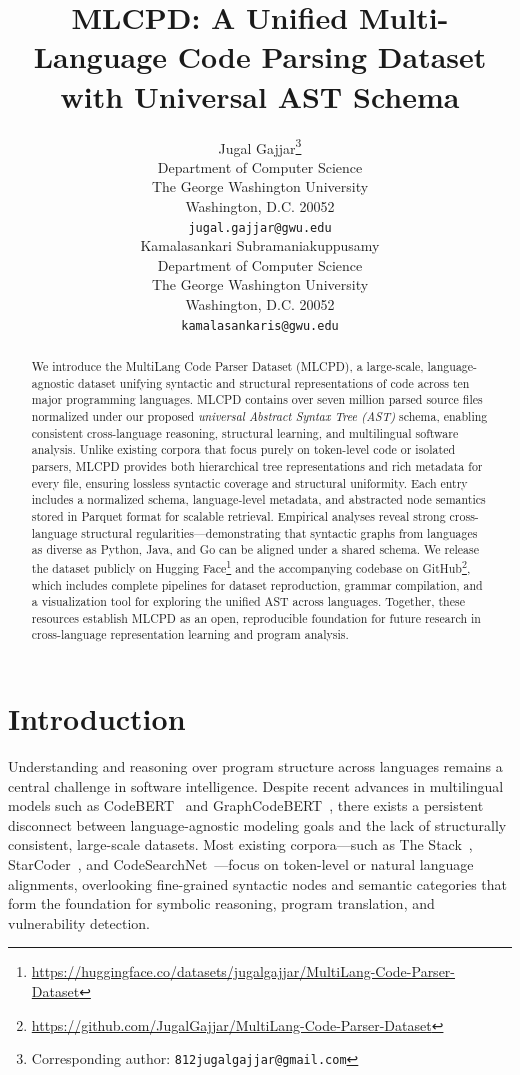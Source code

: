 \documentclass{article}
\title{MLCPD: A Unified Multi-Language Code Parsing Dataset with Universal AST Schema}
\author{
  Jugal Gajjar\thanks{Corresponding author: \texttt{812jugalgajjar@gmail.com}} \\
  Department of Computer Science\\
  The George Washington University\\
  Washington, D.C. 20052 \\
  \texttt{jugal.gajjar@gwu.edu} \\
  \And
  Kamalasankari Subramaniakuppusamy \\
  Department of Computer Science\\
  The George Washington University\\
  Washington, D.C. 20052 \\
  \texttt{kamalasankaris@gwu.edu} \\
}
\begin{document}
\maketitle

\begin{abstract}
We introduce the MultiLang Code Parser Dataset (MLCPD), a large-scale, language-agnostic dataset unifying syntactic and structural representations of code across ten major programming languages. MLCPD contains over seven million parsed source files normalized under our proposed \emph{universal Abstract Syntax Tree (AST)} schema, enabling consistent cross-language reasoning, structural learning, and multilingual software analysis. Unlike existing corpora that focus purely on token-level code or isolated parsers, MLCPD provides both hierarchical tree representations and rich metadata for every file, ensuring lossless syntactic coverage and structural uniformity. Each entry includes a normalized schema, language-level metadata, and abstracted node semantics stored in Parquet format for scalable retrieval. Empirical analyses reveal strong cross-language structural regularities—demonstrating that syntactic graphs from languages as diverse as Python, Java, and Go can be aligned under a shared schema. We release the dataset publicly on Hugging Face\footnote{\url{https://huggingface.co/datasets/jugalgajjar/MultiLang-Code-Parser-Dataset}} and the accompanying codebase on GitHub\footnote{\url{https://github.com/JugalGajjar/MultiLang-Code-Parser-Dataset}}, which includes complete pipelines for dataset reproduction, grammar compilation, and a visualization tool for exploring the unified AST across languages. Together, these resources establish MLCPD as an open, reproducible foundation for future research in cross-language representation learning and program analysis.
\end{abstract}

\section{Introduction}

Understanding and reasoning over program structure across languages remains a central challenge in software intelligence. Despite recent advances in multilingual models such as CodeBERT~\cite{feng2020codebert} and GraphCodeBERT~\cite{guo2020graphcodebert}, there exists a persistent disconnect between language-agnostic modeling goals and the lack of structurally consistent, large-scale datasets. Most existing corpora—such as The Stack~\cite{stack}, StarCoder~\cite{starcoder}, and CodeSearchNet~\cite{codesearch}—focus on token-level or natural language alignments, overlooking fine-grained syntactic nodes and semantic categories that form the foundation for symbolic reasoning, program translation, and vulnerability detection.
\end{document}
